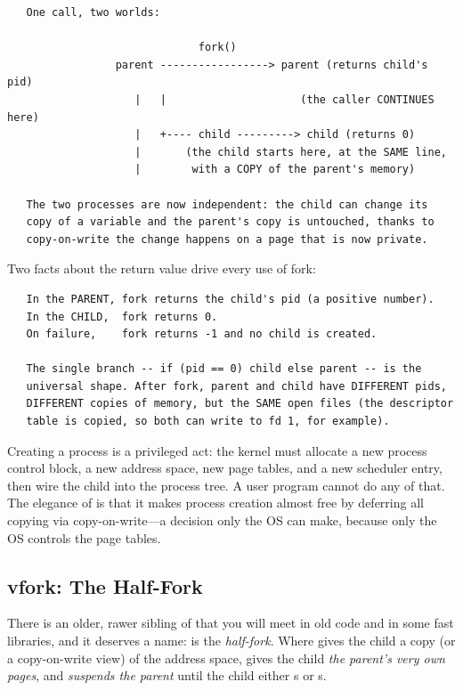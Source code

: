 \begin{verbatim}
   One call, two worlds:

                              fork()
                 parent -----------------> parent (returns child's pid)
                    |   |                     (the caller CONTINUES here)
                    |   +---- child ---------> child (returns 0)
                    |       (the child starts here, at the SAME line,
                    |        with a COPY of the parent's memory)

   The two processes are now independent: the child can change its
   copy of a variable and the parent's copy is untouched, thanks to
   copy-on-write the change happens on a page that is now private.
\end{verbatim}

Two facts about the return value drive every use of fork:

\begin{verbatim}
   In the PARENT, fork returns the child's pid (a positive number).
   In the CHILD,  fork returns 0.
   On failure,    fork returns -1 and no child is created.

   The single branch -- if (pid == 0) child else parent -- is the
   universal shape. After fork, parent and child have DIFFERENT pids,
   DIFFERENT copies of memory, but the SAME open files (the descriptor
   table is copied, so both can write to fd 1, for example).
\end{verbatim}

\begin{osconcept}
Creating a process is a privileged act: the kernel must allocate a new
process control block, a new address space, new page tables, and a new
scheduler entry, then wire the child into the process tree. A user
program cannot do any of that. The elegance of  is that it
makes process creation almost free by deferring all copying via
copy-on-write---a decision only the OS can make, because only the OS
controls the page tables.
\end{osconcept}

\subsection{vfork: The Half-Fork}

There is an older, rawer sibling of  that you will meet in
old code and in some fast libraries, and it deserves a name:
 is the \emph{half-fork}. Where  gives the
child a copy (or a copy-on-write view) of the address space,
 gives the child \emph{the parent's very own pages}, and
\emph{suspends the parent} until the child either s or
s.

